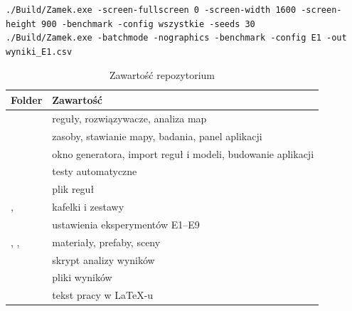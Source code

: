 
\begin{lstlisting}[numbers=none, caption={Przykładowe uruchomienie badań}, label={lst:uruchomienie}]
./Build/Zamek.exe -screen-fullscreen 0 -screen-width 1600 -screen-height 900 -benchmark -config wszystkie -seeds 30
./Build/Zamek.exe -batchmode -nographics -benchmark -config E1 -out wyniki_E1.csv
\end{lstlisting}


\begin{table}
  \centering
  \footnotesize
  \caption{Zawartość repozytorium}
  \label{tab:repozytorium}
  \begin{tabularx}{\linewidth}{@{}lL@{}}
    \toprule
    Folder & Zawartość \\
    \midrule
     & reguły, rozwiązywacze, analiza map \\
     & zasoby, stawianie mapy, badania, panel aplikacji \\
     & okno generatora, import reguł i modeli, budowanie aplikacji \\
     & testy automatyczne \\
     & plik reguł \\
    ,  & kafelki i zestawy \\
     & ustawienia eksperymentów E1--E9 \\
    , ,  & materiały, prefaby, sceny \\
     & skrypt analizy wyników \\
     & pliki wyników \\
     & tekst pracy w LaTeX-u \\
    \bottomrule
  \end{tabularx}
\end{table}
